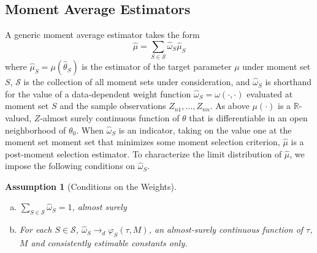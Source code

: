 \documentclass[12pt]{article}
\newtheorem{assump}{Assumption}[section]
\theoremstyle{definition}
\begin{document}
\subsection{Moment Average Estimators}
A generic moment average estimator takes the form
\begin{equation}
	\label{eq:avg}
	\widehat{\mu}=\sum_{S \in \mathscr{S}} \widehat{\omega}_S\widehat{\mu}_S
\end{equation}
where $\widehat{\mu}_S = \mu(\widehat{\theta}_S)$ is the estimator of the target parameter $\mu$ under moment set $S$, $\mathscr{S}$ is the collection of all moment sets under consideration, and $\widehat{\omega}_S$ is shorthand for the value of a data-dependent weight function  $\widehat{\omega}_S=\omega(\cdot, \cdot)$ evaluated at moment set $S$ and the sample observations $Z_{n1}, \hdots, Z_{nn}$.  
As above $\mu(\cdot)$ is a $\mathbb{R}$-valued, $Z$-almost surely continuous function of $\theta$ that is differentiable in an open neighborhood of $\theta_0$. When $\widehat{\omega}_S$ is an indicator, taking on the value one at the moment set moment set that minimizes some moment selection criterion, $\widehat{\mu}$ is a post-moment selection estimator. To characterize the limit distribution of $\widehat{\mu}$, we impose the following conditions on $\widehat{\omega}_S$.
\begin{assump}[Conditions on the Weights]\mbox{}
\label{assump:weights}
\begin{enumerate}[(a)]
	\item $\sum_{S \in \mathscr{S}} \widehat{\omega}_S = 1$, almost surely 
	\item For each $S\in \mathscr{S}$, $\widehat{\omega}_S \rightarrow_d\varphi_S(\tau, M)$, an almost-surely continuous function of $\tau$, $M$ and consistently estimable constants only.
\end{enumerate}
\end{assump}
\end{document}
